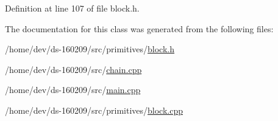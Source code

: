 Definition at line 107 of file block.\+h.



The documentation for this class was generated from the following files\+:\begin{DoxyCompactItemize}
\item 
/home/dev/ds-\/160209/src/primitives/\hyperlink{primitives_2block_8h}{block.\+h}\item 
/home/dev/ds-\/160209/src/\hyperlink{chain_8cpp}{chain.\+cpp}\item 
/home/dev/ds-\/160209/src/\hyperlink{main_8cpp}{main.\+cpp}\item 
/home/dev/ds-\/160209/src/primitives/\hyperlink{block_8cpp}{block.\+cpp}\end{DoxyCompactItemize}
